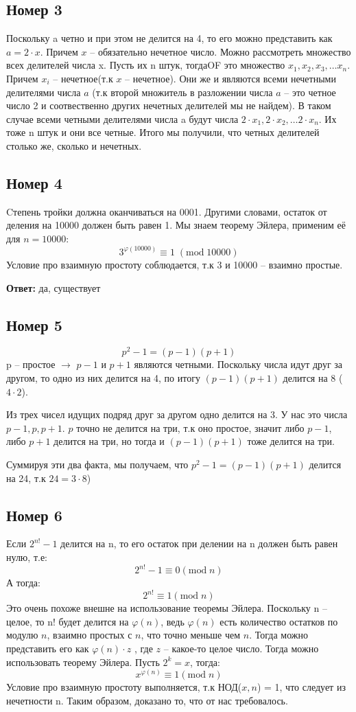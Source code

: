 \documentclass[a4paper,12pt]{article}
\begin{document}
\subsection*{Номер 3}
Поскольку a четно и при этом не делится на 4, то его можно представить как $a = 2 \cdot x$. Причем $x$ -- обязательно нечетное число. Можно рассмотреть множество всех делителей числа x. Пусть их n штук, тогдаOF это множество $x_1, x_2, x_3, \ldots x_n$. Причем $x_i$ -- нечетное(т.к $x$ -- нечетное). Они же и являются всеми нечетными делителями числа $a$  (т.к второй множитель в разложении числа $a$ -- это четное число 2 и соотвественно других нечетных делителей мы не найдем). В таком случае всеми четными делителями числа a будут числа $2 \cdot x_1, 2 \cdot x_2, \ldots 2 \cdot x_n$. Их тоже n штук и они все четные. Итого мы получили, что четных делителей столько же, сколько и нечетных. 
\subsection*{Номер 4}
Cтепень тройки должна оканчиваться на 0001. Другими словами, остаток от деления на 10000 должен быть равен 1. Мы знаем теорему Эйлера, применим её для $n = 10000$:
\[
3^{\varphi(10000)}  \equiv 1 \; (\text{mod} \; 10000)
\]
Условие про взаимную простоту соблюдается, т.к 3 и 10000 -- взаимно простые.
\begin{center}
\textbf{Ответ:} да, существует
\end{center}
\subsection*{Номер 5}
\[
p^2 - 1 = (p-1)(p+1)
\]
p -- простое $\rightarrow$ $p-1$ и $p+1$ являются четными. 
Поскольку числа идут друг за другом, то одно из них делится на 4, по итогу $(p-1)(p+1)$ делится на 8 ($4 \cdot 2$). 

Из трех чисел идущих подряд друг за другом одно делится на 3. У нас это числа $p-1, p, p+1$. $p$ точно не делится на три, т.к оно простое, значит либо $p-1$, либо $p+1$ делится на три, но тогда и $(p-1)(p+1)$ тоже делится на три.

Суммируя эти два факта, мы получаем, что $p^2 - 1= (p-1)(p+1)$ делится на 24, т.к $24 = 3 \cdot 8$)
\subsection*{Номер 6}
Если $2^{n!} -1 $ делится на n, то его остаток при делении на n должен быть равен нулю, т.е:
\[
2^{n!} -1 \equiv 0 (\text{mod}\; n)
\]
А тогда:
\[
2^{n!} \equiv 1 (\text{mod} \; n)
\]
Это очень похоже внешне на использование теоремы Эйлера. Поскольку n -- целое, то n! будет делится на $\varphi (n)$, ведь $\varphi(n)$ есть количество остатков по модулю $n$, взаимно простых с $n$, что точно меньше чем $n$. Тогда можно представить его как $\varphi(n) \cdot z$ , где $z$ -- какое-то целое число. Тогда можно использовать теорему Эйлера. Пусть $2^k = x$, тогда:
\[
x^{\varphi (n)} \equiv 1 (\text{mod} \; n) 
\] 
Условие про взаимную простоту выполняется, т.к НОД($x, n$) = 1, что следует из нечетности n. Таким образом, доказано то, что от нас требовалось.
\end{document}
